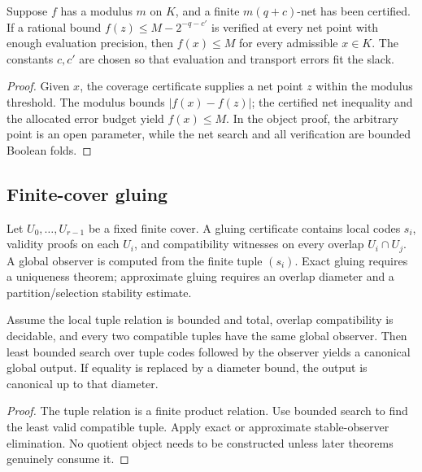 \begin{theorem}
Suppose \(f\) has a modulus \(m\) on \(K\), and a finite \(m(q+c)\)-net has been certified.  If a rational bound \(f(z)\le M-2^{-q-c'}\) is verified at every net point with enough evaluation precision, then \(f(x)\le M\) for every admissible \(x\in K\).  The constants \(c,c'\) are chosen so that evaluation and transport errors fit the slack.
\end{theorem}

\begin{proof}
Given \(x\), the coverage certificate supplies a net point \(z\) within the modulus threshold.  The modulus bounds \(|f(x)-f(z)|\); the certified net inequality and the allocated error budget yield \(f(x)\le M\).  In the object proof, the arbitrary point is an open parameter, while the net search and all verification are bounded Boolean folds.
\end{proof}

\subsection{Finite-cover gluing}

Let \(U_0,\ldots,U_{r-1}\) be a fixed finite cover.  A gluing certificate contains local codes \(s_i\), validity proofs on each \(U_i\), and compatibility witnesses on every overlap \(U_i\cap U_j\).  A global observer is computed from the finite tuple \((s_i)\).  Exact gluing requires a uniqueness theorem; approximate gluing requires an overlap diameter and a partition/selection stability estimate.

\begin{theorem}\label{thm:finite-gluing}
Assume the local tuple relation is bounded and total, overlap compatibility is decidable, and every two compatible tuples have the same global observer.  Then least bounded search over tuple codes followed by the observer yields a canonical global output.  If equality is replaced by a diameter bound, the output is canonical up to that diameter.
\end{theorem}

\begin{proof}
The tuple relation is a finite product relation.  Use bounded search to find the least valid compatible tuple.  Apply exact or approximate stable-observer elimination.  No quotient object needs to be constructed unless later theorems genuinely consume it.
\end{proof}

